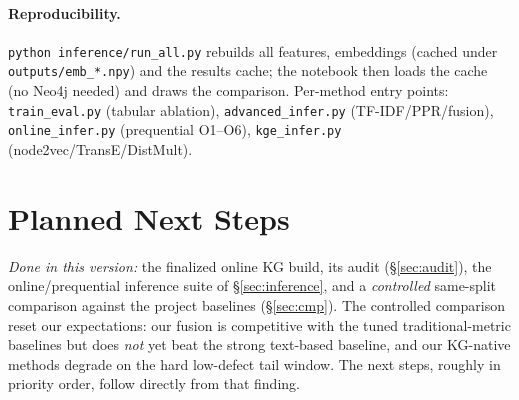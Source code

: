 \documentclass[11pt,a4paper]{article}
\begin{document}
\paragraph{Reproducibility.} \texttt{python inference/run\_all.py} rebuilds all
features, embeddings (cached under \texttt{outputs/emb\_*.npy}) and the results
cache; the notebook then loads the cache (no Neo4j needed) and draws the
comparison. Per-method entry points: \texttt{train\_eval.py} (tabular ablation),
\texttt{advanced\_infer.py} (TF-IDF/PPR/fusion), \texttt{online\_infer.py}
(prequential O1--O6), \texttt{kge\_infer.py} (node2vec/TransE/DistMult).

\section{Planned Next Steps}\label{sec:next}
\emph{Done in this version:} the finalized online KG build, its audit
(\S\ref{sec:audit}), the online/prequential inference suite of
\S\ref{sec:inference}, and a \emph{controlled} same-split comparison against the
project baselines (\S\ref{sec:cmp}). The controlled comparison reset our
expectations: our fusion is competitive with the tuned traditional-metric
baselines but does \emph{not} yet beat the strong text-based baseline, and our
KG-native methods degrade on the hard low-defect tail window. The next steps,
roughly in priority order, follow directly from that finding.
\end{document}
